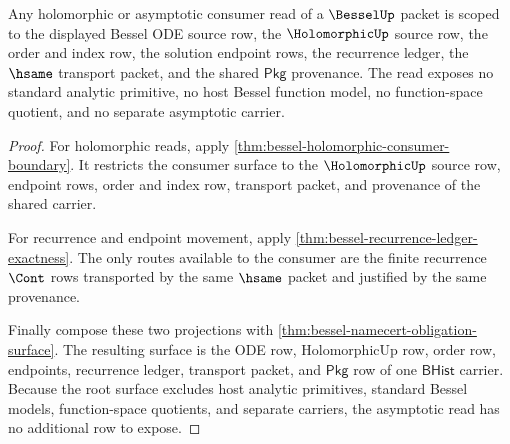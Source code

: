 \begin{theorem}
\label{thm:bessel-asymptotic-ledger-scope}
Any holomorphic or asymptotic consumer read of a $\BesselUp$ packet is scoped
to the displayed Bessel ODE source row, the $\HolomorphicUp$ source row, the
order and index row, the solution endpoint rows, the recurrence ledger, the
$\hsame$ transport packet, and the shared $\mathsf{Pkg}$ provenance. The read
exposes no standard analytic primitive, no host Bessel function model, no
function-space quotient, and no separate asymptotic carrier.
\end{theorem}
\begin{proof}
For holomorphic reads, apply
\autoref{thm:bessel-holomorphic-consumer-boundary}. It restricts the consumer
surface to the $\HolomorphicUp$ source row, endpoint rows, order and index row,
transport packet, and provenance of the shared carrier.

For recurrence and endpoint movement, apply
\autoref{thm:bessel-recurrence-ledger-exactness}. The only routes available to
the consumer are the finite recurrence $\Cont$ rows transported by the same
$\hsame$ packet and justified by the same provenance.

Finally compose these two projections with
\autoref{thm:bessel-namecert-obligation-surface}. The resulting surface is the
ODE row, HolomorphicUp row, order row, endpoints, recurrence ledger, transport
packet, and $\mathsf{Pkg}$ row of one $\mathsf{BHist}$ carrier. Because the
root surface excludes host analytic primitives, standard Bessel models,
function-space quotients, and separate carriers, the asymptotic read has no
additional row to expose.
\end{proof}

